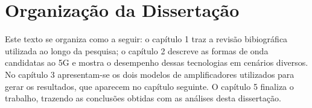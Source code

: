  \section{Organização da Dissertação}
 
Este texto se organiza como a seguir: o capítulo 1 traz a revisão bibiográfica utilizada ao longo da pesquisa; o capítulo 2 descreve as formas de onda candidatas ao 5G e mostra o desempenho dessas tecnologias em cenários diversos. No capítulo 3 apresentam-se os dois modelos de amplificadores utilizados para gerar os resultados, que aparecem no capítulo seguinte. O capítulo 5 finaliza o trabalho, trazendo as conclusões obtidas com as análises desta dissertação. 

